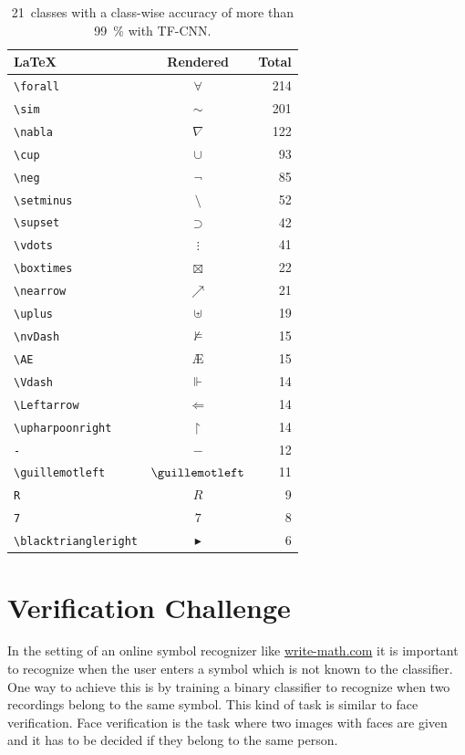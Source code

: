 \begin{table}[h]
    \centering
    \begin{tabular}{lcr}
    \toprule
    \LaTeX & Rendered & Total\\\midrule
    \verb+\forall        + & $\forall        $ & 214 \\
    \verb+\sim           + & $\sim           $ & 201 \\
    \verb+\nabla         + & $\nabla         $ & 122 \\
    \verb+\cup           + & $\cup           $ & 93  \\
    \verb+\neg           + & $\neg           $ & 85  \\
    \verb+\setminus      + & $\setminus      $ & 52  \\
    \verb+\supset        + & $\supset        $ & 42  \\
    \verb+\vdots         + & $\vdots         $ & 41  \\
    \verb+\boxtimes      + & $\boxtimes      $ & 22  \\
    \verb+\nearrow       + & $\nearrow       $ & 21  \\
    \verb+\uplus         + & $\uplus         $ & 19  \\
    \verb+\nvDash        + & $\nvDash        $ & 15  \\
    \verb+\AE            + & \AE               & 15  \\
    \verb+\Vdash         + & $\Vdash         $ & 14  \\
    \verb+\Leftarrow     + & $\Leftarrow     $ & 14  \\
    \verb+\upharpoonright+ & $\upharpoonright$ & 14  \\
    \verb+-              + & $-              $ & 12  \\
    \verb+\guillemotleft + & $\guillemotleft $ & 11  \\
    \verb+R              + & $R              $ & 9   \\
    \verb+7              + & $7              $ & 8   \\
    \verb+\blacktriangleright+ & $\blacktriangleright$ & 6 \\
    \bottomrule
    \end{tabular}
    \caption{21~classes with a class-wise accuracy of more than \SI{99}{\percent}
             with TF-CNN.}
    \label{table:easy-classes}
\end{table}


\section{Verification Challenge}
In the setting of an online symbol recognizer like
\href{http://write-math.com}{write-math.com} it is important to recognize when
the user enters a symbol which is not known to the classifier. One way to achieve
this is by training a binary classifier to recognize when two recordings belong to
the same symbol. This kind of task is similar to face verification.
Face verification is the task where two images with faces are given and it has
to be decided if they belong to the same person.

